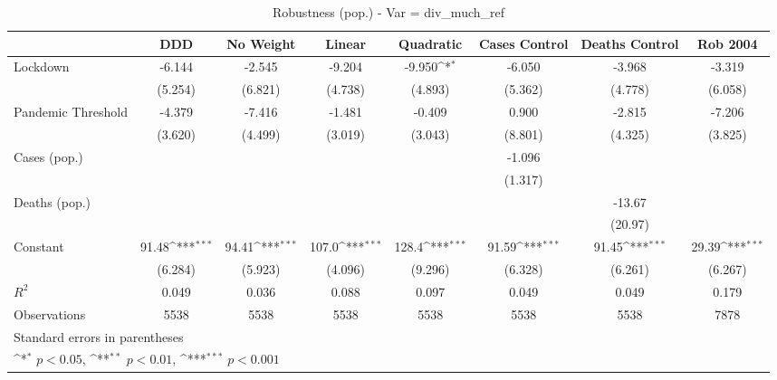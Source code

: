 \documentclass{article}
\begin{document}
{
\def\sym#1{\ifmmode^{#1}\else\(^{#1}\)\fi}
\begin{longtable}{l*{7}{c}}
\caption{Robustness (pop.) - Var = div\_much\_ref}\\
\hline\hline\endfirsthead\hline\endhead\hline\endfoot\endlastfoot
                &\multicolumn{1}{c}{DDD}&\multicolumn{1}{c}{No Weight}&\multicolumn{1}{c}{Linear}&\multicolumn{1}{c}{Quadratic}&\multicolumn{1}{c}{Cases Control}&\multicolumn{1}{c}{Deaths Control}&\multicolumn{1}{c}{Rob 2004}\\
\hline
Lockdown        &   -6.144         &   -2.545         &   -9.204         &   -9.950\sym{*}  &   -6.050         &   -3.968         &   -3.319         \\
                &  (5.254)         &  (6.821)         &  (4.738)         &  (4.893)         &  (5.362)         &  (4.778)         &  (6.058)         \\
Pandemic Threshold&   -4.379         &   -7.416         &   -1.481         &   -0.409         &    0.900         &   -2.815         &   -7.206         \\
                &  (3.620)         &  (4.499)         &  (3.019)         &  (3.043)         &  (8.801)         &  (4.325)         &  (3.825)         \\
Cases (pop.)    &                  &                  &                  &                  &   -1.096         &                  &                  \\
                &                  &                  &                  &                  &  (1.317)         &                  &                  \\
Deaths (pop.)   &                  &                  &                  &                  &                  &   -13.67         &                  \\
                &                  &                  &                  &                  &                  &  (20.97)         &                  \\
Constant        &    91.48\sym{***}&    94.41\sym{***}&    107.0\sym{***}&    128.4\sym{***}&    91.59\sym{***}&    91.45\sym{***}&    29.39\sym{***}\\
                &  (6.284)         &  (5.923)         &  (4.096)         &  (9.296)         &  (6.328)         &  (6.261)         &  (6.267)         \\
\hline
\(R^{2}\)       &    0.049         &    0.036         &    0.088         &    0.097         &    0.049         &    0.049         &    0.179         \\
Observations    &     5538         &     5538         &     5538         &     5538         &     5538         &     5538         &     7878         \\
\hline\hline
\multicolumn{8}{l}{\footnotesize Standard errors in parentheses}\\
\multicolumn{8}{l}{\footnotesize \sym{*} \(p<0.05\), \sym{**} \(p<0.01\), \sym{***} \(p<0.001\)}\\
\end{longtable}
}
\end{document}
